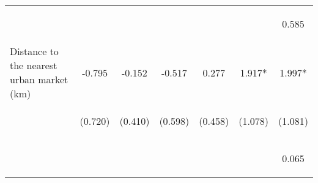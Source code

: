 \begin{center}
\begin{tabular}{lcccccc}
\vspace{4pt} & \begin{footnotesize}[0.408]\end{footnotesize} & \begin{footnotesize}[0.011]\end{footnotesize} & \begin{footnotesize}[0.490]\end{footnotesize} & \begin{footnotesize}[0.641]\end{footnotesize} & \begin{footnotesize}[0.775]\end{footnotesize} & \begin{footnotesize}0.585\end{footnotesize} \\
Distance to the nearest urban market (km) & -0.795 & -0.152 & -0.517 & 0.277 & 1.917* & 1.997* \\
 & \begin{footnotesize}(0.720)\end{footnotesize} & \begin{footnotesize}(0.410)\end{footnotesize} & \begin{footnotesize}(0.598)\end{footnotesize} & \begin{footnotesize}(0.458)\end{footnotesize} & \begin{footnotesize}(1.078)\end{footnotesize} & \begin{footnotesize}(1.081)\end{footnotesize} \\
\vspace{4pt} & \begin{footnotesize}[0.270]\end{footnotesize} & \begin{footnotesize}[0.711]\end{footnotesize} & \begin{footnotesize}[0.388]\end{footnotesize} & \begin{footnotesize}[0.546]\end{footnotesize} & \begin{footnotesize}[0.075]\end{footnotesize} & \begin{footnotesize}0.065\end{footnotesize} \\

\end{tabular}
\end{center}
